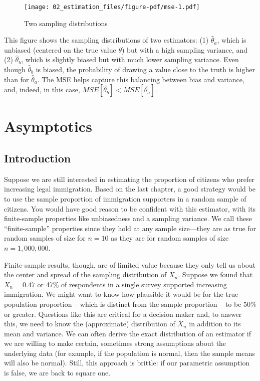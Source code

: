 \documentclass[
  letterpaper,
  DIV=11,
  numbers=noendperiod]{scrreprt}
\newcommand{\Xbar}{\overline{X}}
\theoremstyle{definition}
\theoremstyle{definition}
\theoremstyle{plain}
\theoremstyle{remark}
\begin{document}
\begin{figure}

{\centering \texttt{[image: 02\_estimation\_files/figure-pdf/mse-1.pdf]}

}

\caption{Two sampling distributions}

\end{figure}

This figure shows the sampling distributions of two estimators: (1)
\(\widehat{\theta}_a\), which is unbiased (centered on the true value
\(\theta\)) but with a high sampling variance, and (2)
\(\widehat{\theta}_b\), which is slightly biased but with much lower
sampling variance. Even though \(\widehat{\theta}_b\) is biased, the
probability of drawing a value close to the truth is higher than for
\(\widehat{\theta}_a\). The MSE helps capture this balancing between
bias and variance, and, indeed, in this case,
\(MSE[\widehat{\theta}_b] < MSE[\widehat{\theta}_a]\).

\hypertarget{sec-asymptotics}{%
\chapter{Asymptotics}\label{sec-asymptotics}}

\hypertarget{introduction-3}{%
\section{Introduction}\label{introduction-3}}

Suppose we are still interested in estimating the proportion of citizens
who prefer increasing legal immigration. Based on the last chapter, a
good strategy would be to use the sample proportion of immigration
supporters in a random sample of citizens. You would have good reason to
be confident with this estimator, with its finite-sample properties like
unbiasedness and a sampling variance. We call these ``finite-sample''
properties since they hold at any sample size---they are as true for
random samples of size for \(n = 10\) as they are for random samples of
size \(n = 1,000,000\).

Finite-sample results, though, are of limited value because they only
tell us about the center and spread of the sampling distribution of
\(\Xbar_n\). Suppose we found that \(\Xbar_n = 0.47\) or 47\% of
respondents in a single survey supported increasing immigration. We
might want to know how plausible it would be for the true population
proportion -- which is distinct from the sample proportion -- to be 50\%
or greater. Questions like this are critical for a decision maker and,
to answer this, we need to know the (approximate) distribution of
\(\Xbar_n\) in addition to its mean and variance. We can often derive
the exact distribution of an estimator if we are willing to make
certain, sometimes strong assumptions about the underlying data (for
example, if the population is normal, then the sample means will also be
normal). Still, this approach is brittle: if our parametric assumption
is false, we are back to square one.
\end{document}

